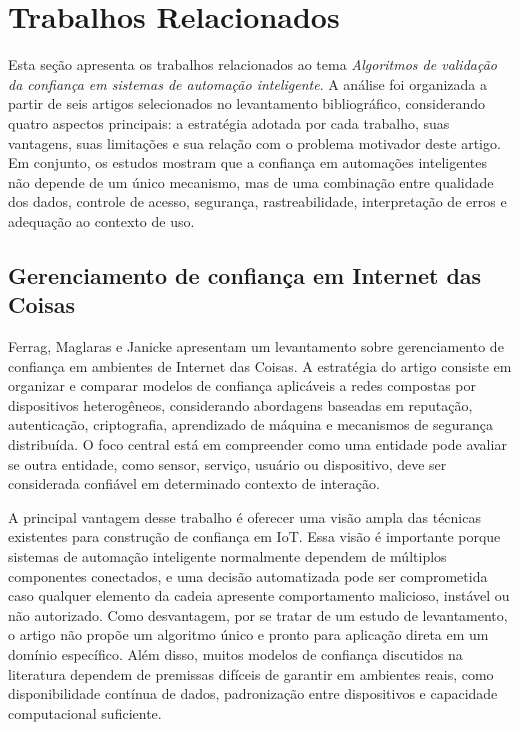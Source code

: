 \documentclass[12pt]{article}
\begin{document}
\section{Trabalhos Relacionados}

Esta seção apresenta os trabalhos relacionados ao tema \textit{Algoritmos de validação da confiança em sistemas de automação inteligente}. A análise foi organizada a partir de seis artigos selecionados no levantamento bibliográfico, considerando quatro aspectos principais: a estratégia adotada por cada trabalho, suas vantagens, suas limitações e sua relação com o problema motivador deste artigo. Em conjunto, os estudos mostram que a confiança em automações inteligentes não depende de um único mecanismo, mas de uma combinação entre qualidade dos dados, controle de acesso, segurança, rastreabilidade, interpretação de erros e adequação ao contexto de uso.

\subsection{Gerenciamento de confiança em Internet das Coisas}

Ferrag, Maglaras e Janicke \cite{ferrag2019} apresentam um levantamento sobre gerenciamento de confiança em ambientes de Internet das Coisas. A estratégia do artigo consiste em organizar e comparar modelos de confiança aplicáveis a redes compostas por dispositivos heterogêneos, considerando abordagens baseadas em reputação, autenticação, criptografia, aprendizado de máquina e mecanismos de segurança distribuída. O foco central está em compreender como uma entidade pode avaliar se outra entidade, como sensor, serviço, usuário ou dispositivo, deve ser considerada confiável em determinado contexto de interação.

A principal vantagem desse trabalho é oferecer uma visão ampla das técnicas existentes para construção de confiança em IoT. Essa visão é importante porque sistemas de automação inteligente normalmente dependem de múltiplos componentes conectados, e uma decisão automatizada pode ser comprometida caso qualquer elemento da cadeia apresente comportamento malicioso, instável ou não autorizado. Como desvantagem, por se tratar de um estudo de levantamento, o artigo não propõe um algoritmo único e pronto para aplicação direta em um domínio específico. Além disso, muitos modelos de confiança discutidos na literatura dependem de premissas difíceis de garantir em ambientes reais, como disponibilidade contínua de dados, padronização entre dispositivos e capacidade computacional suficiente.
\end{document}
